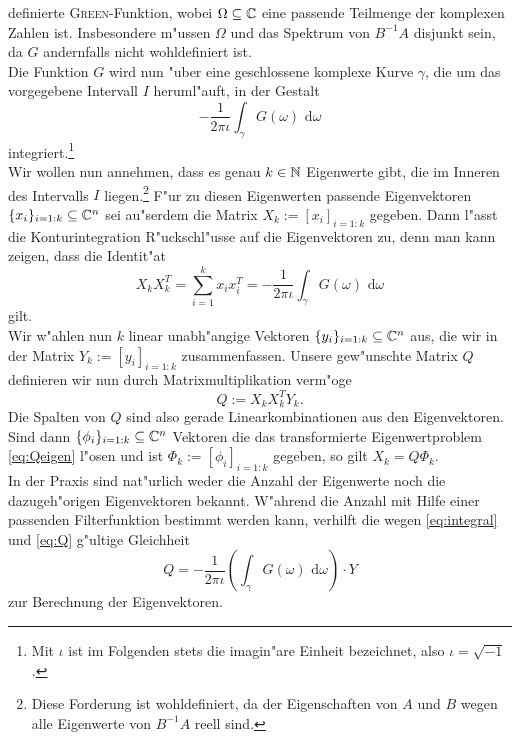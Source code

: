 definierte  \textsc{Green}-Funktion, wobei $\Omega \subseteq \mathbb{C}$ eine passende
Teilmenge der komplexen Zahlen ist. Insbesondere m"ussen $\Omega$ und das
Spektrum von $B^{-1}A$ disjunkt sein, da $G$ andernfalls nicht wohldefiniert ist.\\

Die Funktion $G$ wird nun "uber eine geschlossene komplexe Kurve $\gamma$,
die um das vorgegebene Intervall $I$ heruml"auft, in der Gestalt
\[
-\frac{1}{2\pi\iota}\int_\gamma G(\omega)\text{ d}\omega
\]
integriert.\footnote{Mit $\iota$ ist im Folgenden stets die imagin"are Einheit bezeichnet,
also $\iota = \sqrt{-1}$.}\\

Wir wollen nun annehmen,
dass es genau $k\in\mathbb{N}$ Eigenwerte gibt,
die im Inneren des Intervalls $I$ liegen.\footnote{Diese Forderung ist wohldefiniert, da
der Eigenschaften von $A$ und $B$ wegen alle Eigenwerte von $B^{-1}A$ reell sind.}
F"ur zu diesen Eigenwerten passende Eigenvektoren $\{x_i\}_{i=1:k} \subseteq \mathbb{C}^n$ sei au"serdem die Matrix
$X_k := [x_i]_{i=1:k}$ gegeben.
Dann l"asst die Konturintegration R"uckschl"usse auf die Eigenvektoren zu, denn man kann
zeigen, dass die Identit"at
\begin{equation}\label{eq:integral}
X_k X_k^T = \sum_{i=1}^k x_i x_i^T =
-\frac{1}{2\pi\iota}\int_\gamma G(\omega)\text{ d}\omega
\end{equation}
gilt.\\

Wir w"ahlen nun $k$ linear unabh"angige Vektoren $\{y_i\}_{i=1:k} \subseteq \mathbb{C}^n$
aus, die wir in der Matrix $Y_k := [ y_i ]_{i=1:k}$ zusammenfassen.
Unsere gew"unschte Matrix $Q$ definieren wir nun durch Matrixmultiplikation
verm"oge
\begin{equation}\label{eq:Q}
Q := X_k X_k^T Y_k.
\end{equation}
Die Spalten von $Q$ sind also gerade Linearkombinationen aus den Eigenvektoren.
Sind dann $\{\phi_i\}_{i=1:k} \subseteq \mathbb{C}^n$ Vektoren die das transformierte
Eigenwertproblem \eqref{eq:Qeigen} l"osen
und ist $\Phi_k:=[\phi_i]_{i=1:k}$ gegeben,
so gilt $X_k = Q \Phi_k$.\\

In der Praxis sind nat"urlich weder die Anzahl der Eigenwerte noch die dazugeh"origen Eigenvektoren
bekannt. W"ahrend die Anzahl mit Hilfe einer passenden Filterfunktion bestimmt werden kann,
verhilft die wegen \eqref{eq:integral} und \eqref{eq:Q} g"ultige Gleichheit
\begin{equation}\label{eq:solution}
Q = -\frac{1}{2\pi\iota}\left(\int_\gamma G(\omega)\text{ d}\omega\right)\cdot Y
\end{equation}
zur Berechnung der Eigenvektoren.

